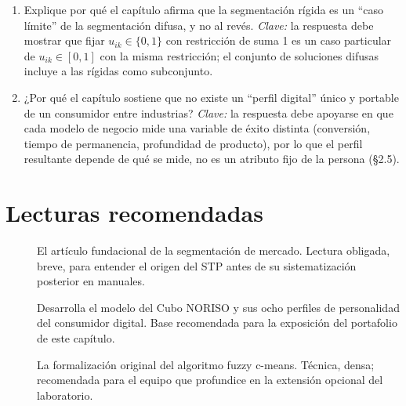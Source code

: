 \begin{enumerate}
  \item Explique por qué el capítulo afirma que la segmentación rígida es un
  \enquote{caso límite} de la segmentación difusa, y no al revés.
  \textit{Clave:} la respuesta debe mostrar que fijar $u_{ik} \in \{0,1\}$
  con restricción de suma 1 es un caso particular de $u_{ik} \in [0,1]$ con
  la misma restricción; el conjunto de soluciones difusas incluye a las
  rígidas como subconjunto.
  \item ¿Por qué el capítulo sostiene que no existe un \enquote{perfil digital}
  único y portable de un consumidor entre industrias? \textit{Clave:} la
  respuesta debe apoyarse en que cada modelo de negocio mide una variable de
  éxito distinta (conversión, tiempo de permanencia, profundidad de
  producto), por lo que el perfil resultante depende de qué se mide, no es
  un atributo fijo de la persona (§2.5).
\end{enumerate}

\section{Lecturas recomendadas}

\begin{description}
  \item[\textcite{smith1956}] El artículo fundacional de la segmentación de
  mercado. Lectura obligada, breve, para entender el origen del STP antes de
  su sistematización posterior en manuales.
  \item[\textcite{delgado2015noriso}] Desarrolla el modelo del Cubo NORISO y
  sus ocho perfiles de personalidad del consumidor digital. Base recomendada
  para la exposición del portafolio de este capítulo.
  \item[\textcite{bezdek1981}] La formalización original del algoritmo fuzzy
  c-means. Técnica, densa; recomendada para el equipo que profundice en la
  extensión opcional del laboratorio.
\end{description}

